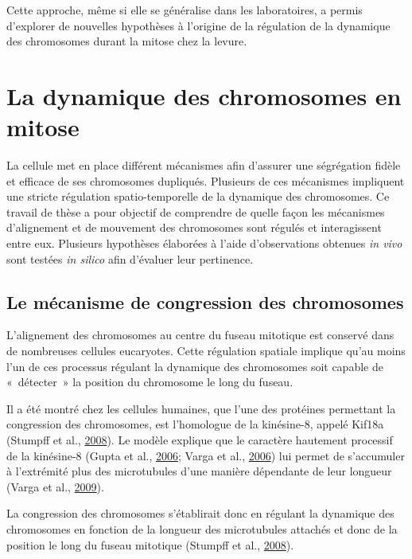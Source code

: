 \documentclass[12pt,a4paper,twoside,openright]{book}
\begin{document}
Cette approche, même si elle se généralise dans les laboratoires, a
permis d'explorer de nouvelles hypothèses à l'origine de la régulation
de la dynamique des chromosomes durant la mitose chez la levure.

\section{La dynamique des chromosomes en
mitose}\label{la-dynamique-des-chromosomes-en-mitose}

La cellule met en place différent mécanismes afin d'assurer une
ségrégation fidèle et efficace de ses chromosomes dupliqués. Plusieurs
de ces mécanismes impliquent une stricte régulation spatio-temporelle de
la dynamique des chromosomes. Ce travail de thèse a pour objectif de
comprendre de quelle façon les mécanismes d'alignement et de mouvement
des chromosomes sont régulés et interagissent entre eux. Plusieurs
hypothèses élaborées à l'aide d'observations obtenues \emph{in vivo}
sont testées \emph{in silico} afin d'évaluer leur pertinence.

\subsection{Le mécanisme de congression des
chromosomes}\label{le-muxe9canisme-de-congression-des-chromosomes}

L'alignement des chromosomes au centre du fuseau mitotique est conservé
dans de nombreuses cellules eucaryotes. Cette régulation spatiale
implique qu'au moins l'un de ces processus régulant la dynamique des
chromosomes soit capable de «~détecter~» la position du chromosome le
long du fuseau.

Il a été montré chez les cellules humaines, que l'une des protéines
permettant la congression des chromosomes, est l'homologue de la
kinésine-8, appelé Kif18a (Stumpff et al.,
\protect\hyperlink{ref-Stumpff2008}{2008}). Le modèle explique que le
caractère hautement processif de la kinésine-8 (Gupta et al.,
\protect\hyperlink{ref-Gupta2006}{2006}; Varga et al.,
\protect\hyperlink{ref-Varga2006}{2006}) lui permet de s'accumuler à
l'extrémité plus des microtubules d'une manière dépendante de leur
longueur (Varga et al., \protect\hyperlink{ref-Varga2009}{2009}).

La congression des chromosomes s'établirait donc en régulant la
dynamique des chromosomes en fonction de la longueur des microtubules
attachés et donc de la position le long du fuseau mitotique (Stumpff et
al., \protect\hyperlink{ref-Stumpff2008}{2008}).
\end{document}
